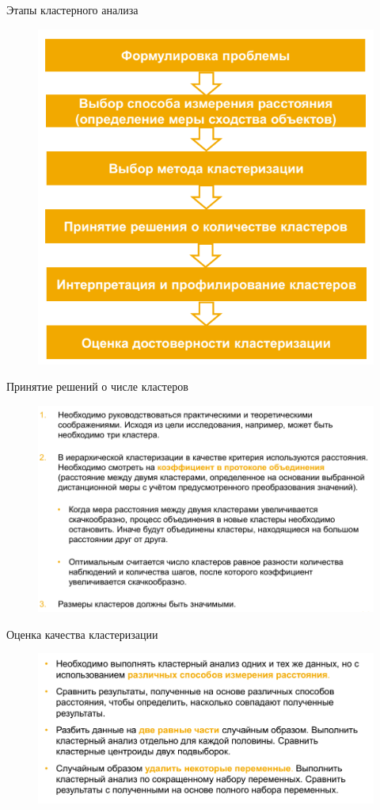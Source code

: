 \documentclass{beamer}
\begin{document}
\begin{frame}{Этапы кластерного анализа}
\begin{figure}[h]
\centering
\includegraphics[scale=0.5]{images/lec07-pic28.png}
\end{figure}
\end{frame}

\begin{frame}{Принятие решений о числе кластеров}
\begin{figure}[h]
\centering
\includegraphics[scale=0.5]{images/lec07-pic26.png}
\end{figure}
\end{frame}

\begin{frame}{Оценка качества кластеризации}
\begin{figure}[h]
\centering
\includegraphics[scale=0.5]{images/lec07-pic27.png}
\end{figure}
\end{frame}
\end{document}
